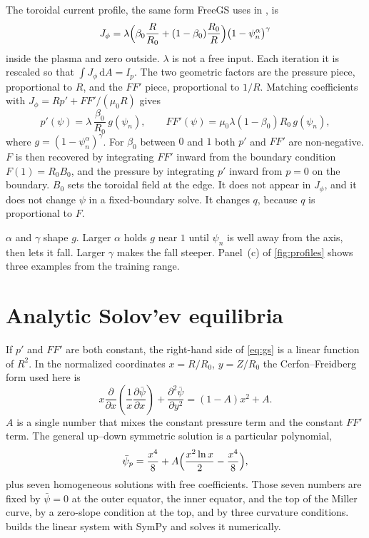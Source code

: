 \documentclass[11pt,a4paper,oneside,openany]{book}
\newcommand{\code}{\path}
\numberwithin{equation}{chapter}
\newcommand{\psin}{\psi_{n}}
\newcommand{\psibar}{\bar{\psi}}
\newcommand{\Ip}{I_{p}}
\theoremstyle{definition}
\begin{document}
The toroidal current profile, the same form FreeGS uses in \code{ConstrainBetapIp}, is
\begin{equation}
\label{eq:Jprofile}
J_{\phi}
=\lambda
\Bigl(\beta_{0}\frac{R}{R_{0}}+(1-\beta_{0})\frac{R_{0}}{R}\Bigr)
\bigl(1-\psin^{\alpha}\bigr)^{\gamma}
\end{equation}
inside the plasma and zero outside. \(\lambda\) is not a free input. Each iteration it is rescaled so that \(\int J_{\phi}\,\mathrm{d}A=\Ip\). The two geometric factors are the pressure piece, proportional to \(R\), and the \(FF'\) piece, proportional to \(1/R\). Matching coefficients with \(J_{\phi}=R p'+FF'/(\mu_{0} R)\) gives
\begin{equation}
\label{eq:pFF}
p'(\psi)=\lambda\,\frac{\beta_{0}}{R_{0}}\,g(\psin),
\qquad
FF'(\psi)=\mu_{0}\lambda(1-\beta_{0})R_{0}\,g(\psin),
\end{equation}
where \(g=(1-\psin^{\alpha})^{\gamma}\). For \(\beta_{0}\) between \(0\) and \(1\) both \(p'\) and \(FF'\) are non-negative. \(F\) is then recovered by integrating \(FF'\) inward from the boundary condition \(F(1)=R_{0} B_{0}\), and the pressure by integrating \(p'\) inward from \(p=0\) on the boundary. \(B_{0}\) sets the toroidal field at the edge. It does not appear in \(J_{\phi}\), and it does not change \(\psi\) in a fixed-boundary solve. It changes \(q\), because \(q\) is proportional to \(F\).

\(\alpha\) and \(\gamma\) shape \(g\). Larger \(\alpha\) holds \(g\) near \(1\) until \(\psin\) is well away from the axis, then lets it fall. Larger \(\gamma\) makes the fall steeper. Panel~(c) of \cref{fig:profiles} shows three examples from the training range.

\section{Analytic Solov'ev equilibria}

If \(p'\) and \(FF'\) are both constant, the right-hand side of \eqref{eq:gs} is a linear function of \(R^{2}\). In the normalized coordinates \(x=R/R_{0}\), \(y=Z/R_{0}\) the Cerfon--Freidberg form used here is
\begin{equation}
\label{eq:solovev}
x\frac{\partial}{\partial x}\!\left(\frac{1}{x}\frac{\partial\psibar}{\partial x}\right)
+\frac{\partial^{2}\psibar}{\partial y^{2}}
=(1-A)x^{2}+A.
\end{equation}
\(A\) is a single number that mixes the constant pressure term and the constant \(FF'\) term. The general up--down symmetric solution is a particular polynomial,
\[
\psibar_{p}=\frac{x^{4}}{8}+A\Bigl(\frac{x^{2}\ln x}{2}-\frac{x^{4}}{8}\Bigr),
\]
plus seven homogeneous solutions with free coefficients. Those seven numbers are fixed by \(\psibar=0\) at the outer equator, the inner equator, and the top of the Miller curve, by a zero-slope condition at the top, and by three curvature conditions. \code{gs/analytic.py} builds the linear system with SymPy and solves it numerically.
\end{document}
